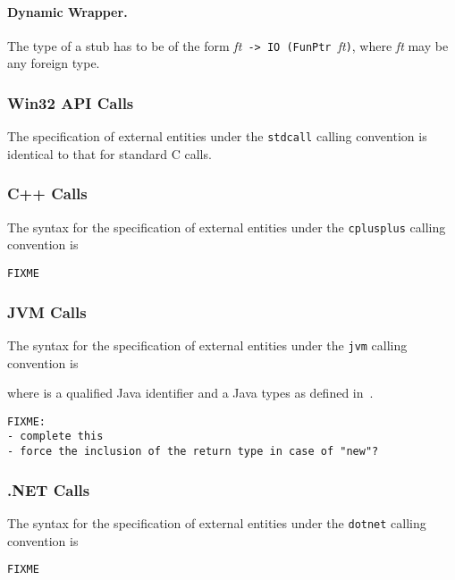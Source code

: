\documentclass[a4paper,twosides]{article}
\newcommand{\code}[1]{\texttt{#1}}      %
\begin{document}
\paragraph{Dynamic Wrapper.}
The type of a  stub has to be of the form \textit{ft}\code{ ->
  }\code{IO (FunPtr }\textit{ft}\code), where \textit{ft} may be any foreign
type.

\subsubsection{Win32 API Calls}

The specification of external entities under the \code{stdcall} calling
convention is identical to that for standard C calls.

\subsubsection{C{+}{+} Calls}

The syntax for the specification of external entities under the
\code{cplusplus} calling convention is
%
\begin{verbatim}
FIXME
\end{verbatim}

\subsubsection{JVM Calls}

The syntax for the specification of external entities under the \code{jvm}
calling convention is 
%
\begin{grammar}
\end{grammar}
%
where  is a qualified Java identifier and  a Java
types as defined in~\cite{gosling-etal:Java}.

\begin{verbatim}
FIXME: 
- complete this
- force the inclusion of the return type in case of "new"?
\end{verbatim}

\subsubsection{.NET Calls}

The syntax for the specification of external entities under the \code{dotnet}
calling convention is
%
\begin{verbatim}
FIXME
\end{verbatim}
\end{document}
